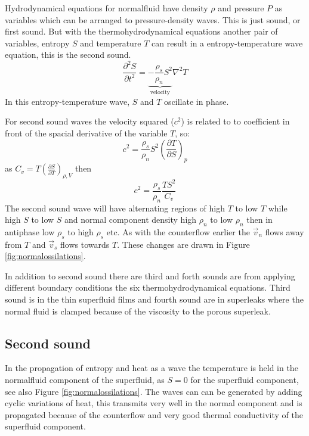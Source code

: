 Hydrodynamical equations for normalfluid have density $\rho$ and pressure $P$
as variables which can be arranged to pressure-density waves. This is just sound,
or first sound.
But with the thermohydrodynamical equations another pair of variables, entropy $S$ and
temperature $T$ can result in a entropy-temperature wave equation, this is the second sound.
\begin{equation}
\frac{\partial^2 S }{ \partial t^2} = \underbrace{-\frac{\rho_s}{\rho_n}S^2}_\text{velocity} \nabla^2 T 
\end{equation}
In this entropy-temperature wave, $S$ and $T$ oscillate in phase. 

For second sound waves the velocity squared ($c^2$) is related to to coefficient
in front of the spacial derivative of the variable $T$, so:
\begin{equation}
c^2 = \frac{\rho_s}{\rho_n} S^2 \left( \frac{\partial T}{\partial S} \right)_{p} 
\end{equation}
as $ C_v = T\left(\frac{\partial S}{\partial T} \right)_{\rho, V} $ then
\begin{equation}
c^2 = \frac{\rho_s}{\rho_n}\frac{TS^2}{C_v} \label{equ:c2rsrnts2cv}
\end{equation}
The second sound wave will have alternating regions of high $T$ to low $T$
while high $S$ to low $S$ and normal component density high $\rho_n$ to low $\rho_n$
then in antiphase low $\rho_s$ to high $\rho_s$ etc.
As with the counterflow earlier the $\vec{v}_n$
flows away from $T$ and $\vec{v}_s$ flows towards $T$.
These changes are drawn in Figure \ref{fig:normalossilations}.



In addition to second sound there are third and forth sounds are from applying
different boundary conditions the six thermohydrodynamical equations.
Third sound is in the thin superfluid films and fourth sound are in superleaks
where the normal fluid is clamped because of the viscosity to the porous superleak.

\subsection{Second sound}
In the propagation of entropy and heat as a wave
the temperature is held in the normalfluid component of the superfluid, as $S=0$
for the superfluid component, see also Figure \ref{fig:normalossilations}.
The waves can can be generated by adding cyclic variations of heat,
this transmits very well in the normal component and is propagated
because of the counterflow and very good thermal conductivity of the superfluid
component.

